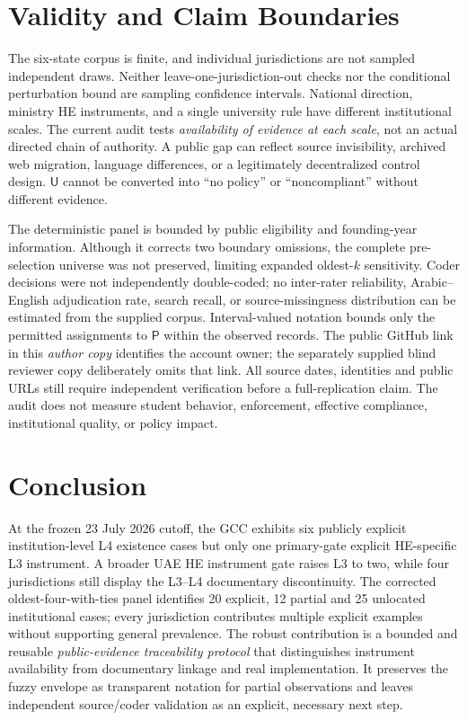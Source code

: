 \documentclass[conference,letterpaper]{IEEEtran}
\newcommand{\stP}{\textsf{P}}
\newcommand{\stU}{\textsf{U}}
\begin{document}

\section{Validity and Claim Boundaries}
The six-state corpus is finite, and individual jurisdictions are not sampled independent draws. Neither leave-one-jurisdiction-out checks nor the conditional perturbation bound are sampling confidence intervals. National direction, ministry HE instruments, and a single university rule have different institutional scales. The current audit tests \emph{availability of evidence at each scale}, not an actual directed chain of authority. A public gap can reflect source invisibility, archived web migration, language differences, or a legitimately decentralized control design. $\stU$ cannot be converted into ``no policy'' or ``noncompliant'' without different evidence.

The deterministic panel is bounded by public eligibility and founding-year information. Although it corrects two boundary omissions, the complete pre-selection universe was not preserved, limiting expanded oldest-$k$ sensitivity. Coder decisions were not independently double-coded; no inter-rater reliability, Arabic--English adjudication rate, search recall, or source-missingness distribution can be estimated from the supplied corpus. Interval-valued notation bounds only the permitted assignments to $\stP$ within the observed records. The public GitHub link in this \emph{author copy} identifies the account owner; the separately supplied blind reviewer copy deliberately omits that link. All source dates, identities and public URLs still require independent verification before a full-replication claim. The audit does not measure student behavior, enforcement, effective compliance, institutional quality, or policy impact.

\section{Conclusion}
At the frozen 23 July 2026 cutoff, the GCC exhibits six publicly explicit institution-level L4 existence cases but only one primary-gate explicit HE-specific L3 instrument. A broader UAE HE instrument gate raises L3 to two, while four jurisdictions still display the L3--L4 documentary discontinuity. The corrected oldest-four-with-ties panel identifies 20 explicit, 12 partial and 25 unlocated institutional cases; every jurisdiction contributes multiple explicit examples without supporting general prevalence. The robust contribution is a bounded and reusable \emph{public-evidence traceability protocol} that distinguishes instrument availability from documentary linkage and real implementation. It preserves the fuzzy envelope as transparent notation for partial observations and leaves independent source/coder validation as an explicit, necessary next step.
\end{document}
